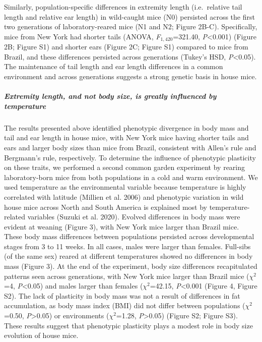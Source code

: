 \documentclass[]{article}
\let\oldsubparagraph\subparagraph
\renewcommand{\subparagraph}[1]{\oldsubparagraph{#1}\mbox{}}
\begin{document}
Similarly, population-specific differences in extremity length
(i.e.~relative tail length and relative ear length) in wild-caught mice
(N0) persisted across the first two generations of laboratory-reared
mice (N1 and N2; Figure 2B-C). Specifically, mice from New York had
shorter tails (ANOVA, \emph{F}\(_{1,420}\)=321.40,
\emph{P}\textless{}0.001) (Figure 2B; Figure S1) and shorter ears
(Figure 2C; Figure S1) compared to mice from Brazil, and these
differences persisted across generations (Tukey's HSD,
\emph{P}\textless{}0.05). The maintenance of tail length and ear length
differences in a common environment and across generations suggests a
strong genetic basis in house mice.

\vspace{2.5mm}

\hypertarget{extremity-length-and-not-body-size-is-greatly-influenced-by-temperature}{%
\subparagraph{\texorpdfstring{\emph{Extremity length, and not body size,
is greatly influenced by
temperature}}{Extremity length, and not body size, is greatly influenced by temperature}}\label{extremity-length-and-not-body-size-is-greatly-influenced-by-temperature}}

The results presented above identified phenotypic divergence in body
mass and tail and ear length in house mice, with New York mice having
shorter tails and ears and larger body sizes than mice from Brazil,
consistent with Allen's rule and Bergmann's rule, respectively. To
determine the influence of phenotypic plasticity on these traits, we
performed a second common garden experiment by rearing laboratory-born
mice from both populations in a cold and warm environment. We used
temperature as the environmental variable because temperature is highly
correlated with latitude (Millien et al. 2006) and phenotypic variation
in wild house mice across North and South America is explained most by
temperature-related variables (Suzuki et al. 2020). Evolved differences
in body mass were evident at weaning (Figure 3), with New York mice
larger than Brazil mice. These body mass differences between populations
persisted across developmental stages from 3 to 11 weeks. In all cases,
males were larger than females. Full-sibs (of the same sex) reared at
different temperatures showed no differences in body mass (Figure 3). At
the end of the experiment, body size differences recapitulated patterns
seen across generations, with New York mice larger than Brazil mice
(\(\chi^2\)=4, \emph{P}\textless{}0.05) and males larger than females
(\(\chi^2\)=42.15, \emph{P}\textless{}0.001 (Figure 4, Figure S2). The
lack of plasticity in body mass was not a result of differences in fat
accumulation, as body mass index (BMI) did not differ between
populations (\(\chi^2\)=0.50, \emph{P}\textgreater{}0.05) or
environments (\(\chi^2\)=1.28, \emph{P}\textgreater{}0.05) (Figure S2;
Figure S3). These results suggest that phenotypic plasticity plays a
modest role in body size evolution of house mice.
\end{document}
